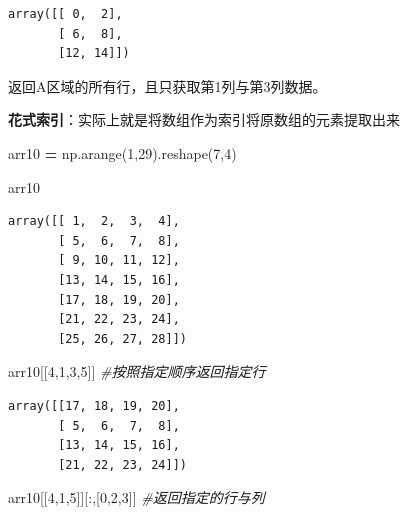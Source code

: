 \documentclass[]{article}
\newenvironment{Shaded}{\begin{snugshade}}{\end{snugshade}}
\newcommand{\DecValTok}[1]{\textcolor[rgb]{0.00,0.00,0.81}{#1}}
\newcommand{\CommentTok}[1]{\textcolor[rgb]{0.56,0.35,0.01}{\textit{#1}}}
\newcommand{\OperatorTok}[1]{\textcolor[rgb]{0.81,0.36,0.00}{\textbf{#1}}}
\newcommand{\NormalTok}[1]{#1}
\begin{document}
\begin{verbatim}
array([[ 0,  2],
       [ 6,  8],
       [12, 14]])
\end{verbatim}

返回A区域的所有行，且只获取第1列与第3列数据。

\textbf{花式索引}：实际上就是将数组作为索引将原数组的元素提取出来

\begin{Shaded}
\begin{Highlighting}[]
\NormalTok{arr10 }\OperatorTok{=}\NormalTok{ np.arange(}\DecValTok{1}\NormalTok{,}\DecValTok{29}\NormalTok{).reshape(}\DecValTok{7}\NormalTok{,}\DecValTok{4}\NormalTok{)}
\end{Highlighting}
\end{Shaded}

\begin{Shaded}
\begin{Highlighting}[]
\NormalTok{arr10}
\end{Highlighting}
\end{Shaded}

\begin{verbatim}
array([[ 1,  2,  3,  4],
       [ 5,  6,  7,  8],
       [ 9, 10, 11, 12],
       [13, 14, 15, 16],
       [17, 18, 19, 20],
       [21, 22, 23, 24],
       [25, 26, 27, 28]])
\end{verbatim}

\begin{Shaded}
\begin{Highlighting}[]
\NormalTok{arr10[[}\DecValTok{4}\NormalTok{,}\DecValTok{1}\NormalTok{,}\DecValTok{3}\NormalTok{,}\DecValTok{5}\NormalTok{]] }\CommentTok{#按照指定顺序返回指定行}
\end{Highlighting}
\end{Shaded}

\begin{verbatim}
array([[17, 18, 19, 20],
       [ 5,  6,  7,  8],
       [13, 14, 15, 16],
       [21, 22, 23, 24]])
\end{verbatim}

\begin{Shaded}
\begin{Highlighting}[]
\NormalTok{arr10[[}\DecValTok{4}\NormalTok{,}\DecValTok{1}\NormalTok{,}\DecValTok{5}\NormalTok{]][:,[}\DecValTok{0}\NormalTok{,}\DecValTok{2}\NormalTok{,}\DecValTok{3}\NormalTok{]] }\CommentTok{#返回指定的行与列}
\end{Highlighting}
\end{Shaded}
\end{document}
